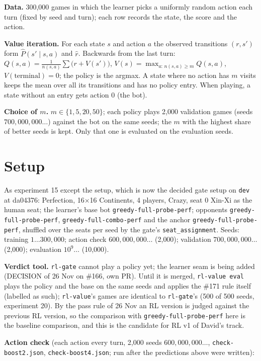 \documentclass{../polyexp}
\begin{document}
\textbf{Data.} 300{,}000 games in which the learner picks a uniformly random action each turn (fixed by seed and
turn); each row records the state, the score and the action.

\textbf{Value iteration.} For each state $s$ and action $a$ the observed transitions $(r, s')$ form $\hat P(s'\mid
s,a)$ and $\hat r$. Backwards from the last turn: $Q(s,a) = \frac{1}{n(s,a)}\sum \bigl(r + V(s')\bigr)$,
$V(s) = \max_{a:\,n(s,a) \ge m} Q(s,a)$, $V(\text{terminal}) = 0$; the policy is the argmax. A state where no action
has $m$ visits keeps the mean over all its transitions and has no policy entry. When playing, a state without an
entry gets action 0 (the bot).

\textbf{Choice of $m$.} $m \in \{1, 5, 20, 50\}$; each policy plays 2{,}000 validation games (seeds
$700{,}000{,}000\dots$) against the bot on the same seeds; the $m$ with the highest share of better seeds is kept.
Only that one is evaluated on the evaluation seeds.

\section{Setup}
As experiment 15 except the setup, which is now the decided gate setup on \texttt{dev} at da04376: Perfection,
16$\times$16 Continents, 4 players, Crazy, seat 0 Xin-Xi as the human seat; the learner's base bot
\texttt{greedy-full-probe-perf}; opponents \texttt{greedy-full-probe-perf}, \texttt{greedy-full-combo-perf} and the
anchor \texttt{greedy-full-probe-perf}, shuffled over the seats per seed by the gate's \texttt{seat\_assignment}.
Seeds: training $1\dots300{,}000$; action check $600{,}000{,}000\dots$ (2{,}000); validation
$700{,}000{,}000\dots$ (2{,}000); evaluation $10^9\dots$ (10{,}000).

\textbf{Verdict tool.} \texttt{rl-gate} cannot play a policy yet; the learner seam is being added (DECISION of 26 Nov
on \#166, own PR). Until it is merged, \texttt{rl-value eval} plays the policy and the base on the same seeds and
applies the \#171 rule itself (labelled as such); \texttt{rl-value}'s games are identical to \texttt{rl-gate}'s
(500 of 500 seeds, experiment 20). By the pass rule of 26 Nov an RL version is judged against the previous RL
version, so the comparison with \texttt{greedy-full-probe-perf} here is the baseline comparison, and this is the
candidate for RL v1 of David's track.

\textbf{Action check} (each action every turn, 2{,}000 seeds $600{,}000{,}000\dots$, \texttt{check-boost2.json},
\texttt{check-boost4.json}; run after the predictions above were written):
\end{document}
